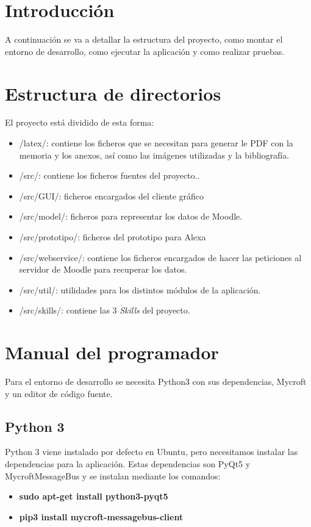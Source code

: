 
\section{Introducción}

A continuación se va a detallar la estructura del proyecto, como montar el entorno de desarrollo, como ejecutar la aplicación y como realizar pruebas.

\section{Estructura de directorios}

El proyecto está dividido de esta forma:

\begin{itemize}
	\item /latex/: contiene los ficheros que se necesitan para generar le PDF con la memoria y los anexos, así como las imágenes utilizadas y la bibliografía.
	\item /src/: contiene los ficheros fuentes del proyecto..
	\item /src/GUI/: ficheros encargados del cliente gráfico
	\item /src/model/: ficheros para representar los datos de Moodle.
	\item /src/prototipo/: ficheros del prototipo para Alexa
	\item /src/webservice/: contiene los ficheros encargados de hacer las peticiones al servidor de Moodle para recuperar los datos.
	\item /src/util/: utilidades para los distintos módulos de la aplicación.
	\item /src/skills/: contiene las 3 \textit{Skills} del proyecto.	
\end{itemize}

\section{Manual del programador}

Para el entorno de desarrollo se necesita Python3 con sus dependencias, Mycroft y un editor de código fuente.

\subsection{Python 3}

Python 3 viene instalado por defecto en Ubuntu, pero necesitamos instalar las dependencias para la aplicación. Estas dependencias son PyQt5 y MycroftMessageBus y se instalan mediante los comandos:
\begin{itemize}
	\item \textbf{sudo apt-get install python3-pyqt5}
	\item \textbf{pip3 install mycroft-messagebus-client}
\end{itemize}

